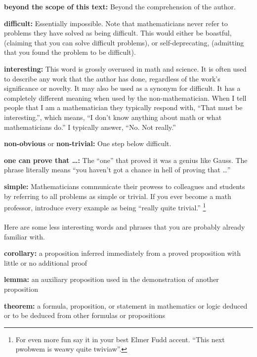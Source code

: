\begin{description}
\item{\textbf{beyond the scope of this text:}}
  Beyond the comprehension of the author.
\item{\textbf{difficult:}}
  Essentially impossible.  Note that mathematicians never refer to problems 
  they have solved as being difficult.  This would either be boastful, 
  (claiming that you can solve difficult problems), or self-deprecating,
  (admitting that you found the problem to be difficult).
\item{\textbf{interesting:}}
  This word is grossly overused in math and science.
  It is often used to describe any work that the author has done, regardless 
  of the work's significance or novelty.
  It may also be used as a synonym for difficult.
  It has a completely different meaning when used by the non-mathematician.
  When I tell people that I am a mathematician they typically respond 
  with, ``That must be interesting.'', which means, ``I don't know 
  anything about math or what mathematicians do.''  I typically answer,
  ``No.  Not really.''  
\item{\textbf{non-obvious} or \textbf{non-trivial:}}
  One step below difficult.
\item{\textbf{one can prove that \ldots:}}
  The ``one'' that proved it was a genius like Gauss.  The phrase literally 
  means ``you haven't got a chance in hell of proving that \ldots''
\item{\textbf{simple:}}
  Mathematicians communicate their prowess to colleagues and students by 
  referring to all problems as simple or trivial.  If you ever become a math
  professor, introduce every example as being ``really quite trivial.''
  \footnote{For even more fun say it in your best Elmer Fudd accent.
    ``This next pwobwem is weawy quite twiviaw''.}
\end{description}



\paragraph{}
Here are some less interesting words and phrases that you are 
probably already familiar with.

\begin{description}
\item{\textbf{corollary:}}
  a proposition inferred immediately from a proved proposition with little 
  or no additional proof
\item{\textbf{lemma:}}
  an auxiliary proposition used in the demonstration of another proposition
\item{\textbf{theorem:}}
  a formula, proposition, or statement in mathematics or logic deduced or 
  to be deduced from other formulas or propositions
\end{description}


